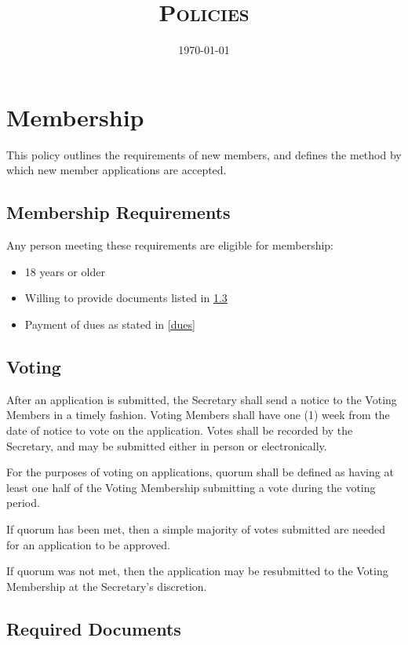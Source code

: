 \documentclass[10pt,letterpaper,titlepage]{article}
\title{%
    \textsc{\LARGE \corpname \\
    \Large Policies
    }
}
\date{\today}
\author{}
\begin{document}
\maketitle

\tableofcontents
\newpage

\section{Membership}
This policy outlines the requirements of new members, and defines the method by 
which new member applications are accepted.

\subsection{Membership Requirements}

Any person meeting these requirements are eligible for membership:
\begin{itemize}
    \item 18 years or older
    \item Willing to provide documents listed in \ref{memberdocs}
    \item Payment of dues as stated in \ref{dues}
\end{itemize}

\subsection{Voting}
After an application is submitted, the Secretary shall send a notice to the 
Voting Members in a timely fashion. Voting Members shall have one (1) week from 
the date of notice to vote on the application. Votes shall be recorded by the 
Secretary, and may be submitted either in person or electronically.

For the purposes of voting on applications, quorum shall be defined as having at
least one half of the Voting Membership submitting a vote during the voting 
period.

If quorum has been met, then a simple majority of votes submitted are needed for
an application to be approved.

If quorum was not met, then the application may be resubmitted to the Voting 
Membership at the Secretary's discretion.

\subsection{Required Documents}
\label{memberdocs}
\end{document}
